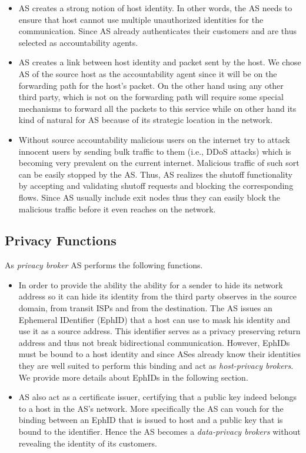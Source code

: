 \begin{itemize}
    \item  AS creates a strong notion of host identity. In other words, the AS needs to ensure that host cannot use multiple unauthorized identities for the communication. Since AS already authenticates their customers and are thus selected as accountability agents.
    \item AS creates a link between host identity and packet sent by the host. We chose AS of the source host as the accountability agent since it will be on the forwarding path for the host's packet. On the other hand using any other third party, which is not on the forwarding path will require some special mechanisms to forward all the packets to this service while on other hand its kind of natural for AS because of its strategic location in the network.
    \item Without source accountability malicious users on the internet try to attack innocent users by sending bulk traffic to them (i.e., DDoS attacks) which is becoming very prevalent on the current internet. Malicious traffic of such sort can be easily stopped by the AS. Thus, AS realizes the shutoff functionality by accepting and validating shutoff requests and blocking the corresponding flows. Since AS usually include exit nodes thus they can easily block the malicious traffic before it even reaches on the network.
\end{itemize}

\subsection{Privacy Functions} As \textit{privacy broker} AS performs the following functions.

\begin{itemize}
    \item In order to provide the ability the ability for a sender to hide its network address so it can hide its identity from the third party observes in the source domain, from transit ISPs and from the destination. The AS issues an Ephemeral IDentifier (EphID) that a host can use to mask his identity and use it as a source address. This identifier serves as a privacy preserving return address and thus not break bidirectional communication. However, EphIDs must be bound to a host identity and since ASes already know their identities they are well suited to perform this binding and act as \textit{host-privacy brokers}. We provide more details about EphIDs in the following section.
    \item AS also act as a certificate issuer, certifying that a public key indeed belongs to a host in the AS's network. More specifically the AS can vouch for the binding between an EphID that is issued to host and a public key that is bound to the identifier. Hence the AS becomes a \textit{data-privacy brokers} without revealing the identity of its customers.
\end{itemize}

